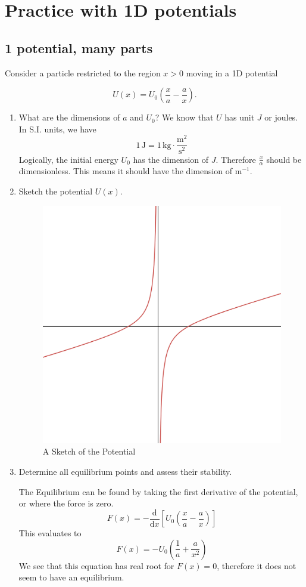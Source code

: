 \documentclass[12pt]{article}
\newcommand{\dydx}[2]{\frac{\text{d} #1}{\text{d} #2}}
\newcommand{\sqbkt}[1]{\left[ #1 \right]}
\newcommand{\paren}[1]{\left( #1 \right)}
\begin{document}
\section{Practice with 1D potentials}

\subsection{1 potential, many parts}
Consider a particle restricted to the region \( x > 0 \) moving in a 1D potential

\[
U(x) = U_0 \left( \frac{x}{a} - \frac{a}{x} \right) .
\]

\begin{enumerate}
    \item What are the dimensions of \(a\) and \(U_0\)?
        We know that $U$ has unit $J$ or joules. In S.I. units, we have
        \[
        1\,\text{J} = 1 \,\text{kg}\cdot\frac{\text{m}^2}{\text{s}^2}
        \]
        Logically, the initial energy $U_0$ has the dimension of $J$. Therefore $\frac{x}{\alpha}$ should be dimensionless. This means it should have the dimension of $\text{m}^{-1}$.
        
    \item Sketch the potential \(U(x)\).

    \begin{figure}[!h]
        \centering
        \includegraphics[width=0.5\linewidth]{Pictures//PS02/PS02-2-1.png}
        \caption{A Sketch of the Potential}
        \label{fig:ps02-2-1}
    \end{figure}
    
    \item Determine all equilibrium points and assess their stability.

    The Equilibrium can be found by taking the first derivative of the potential, or where the force is zero. 
    \[
    F(x) = -\dydx{}{x}\sqbkt{U_0 \left( \frac{x}{a} - \frac{a}{x} \right)}
    \]
    This evaluates to
    \[
    F(x) = -U_0\paren{\frac{1}{a} + \frac{a}{x^2}}
    \]
    We see that this equation has real root for $F(x) = 0$, therefore it does not seem to have an equilibrium.

    
    
\end{enumerate}
\end{document}
